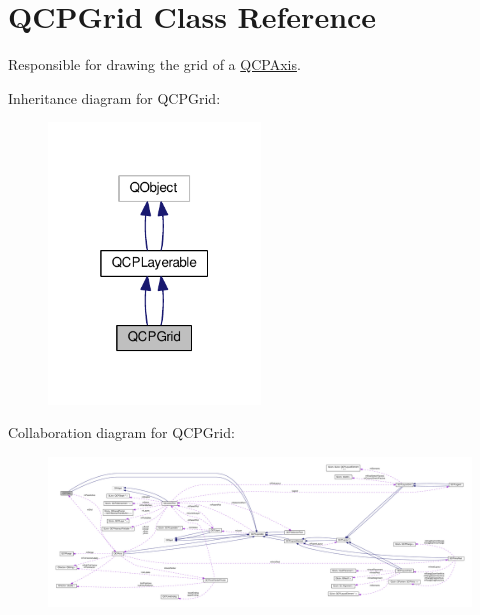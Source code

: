 \hypertarget{class_q_c_p_grid}{}\section{Q\+C\+P\+Grid Class Reference}
\label{class_q_c_p_grid}


Responsible for drawing the grid of a \hyperlink{class_q_c_p_axis}{Q\+C\+P\+Axis}.  




Inheritance diagram for Q\+C\+P\+Grid\+:\nopagebreak
\begin{figure}[H]
\begin{center}
\leavevmode
\includegraphics[width=160pt]{class_q_c_p_grid__inherit__graph}
\end{center}
\end{figure}


Collaboration diagram for Q\+C\+P\+Grid\+:\nopagebreak
\begin{figure}[H]
\begin{center}
\leavevmode
\includegraphics[width=350pt]{class_q_c_p_grid__coll__graph}
\end{center}
\end{figure}
